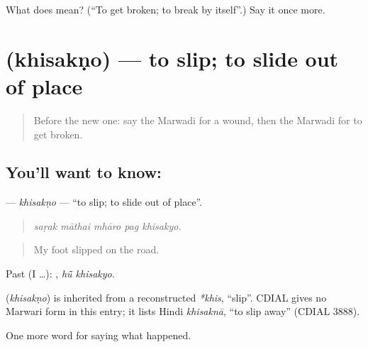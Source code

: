 \begin{tcolorbox}[breakable,colback=teal!4,colframe=teal!35!black,title={Before you move on}]
What does  mean? (\textquotedblleft{}To get broken; to break by itself\textquotedblright{}.) Say it once more.
\end{tcolorbox}
\section[\texorpdfstring{\mw{खिसकणो} (khisakṇo)}{खिसकणो (khisakṇo)}]{ (khisakṇo) — to slip; to slide out of place}

\label{lesson:MW-C241-khisakno}



\begin{quote}
Before the new one: say the Marwadi for a wound, then the Marwadi for to get broken.
\end{quote}

\subsection*{You'll want to know: }
\textbf{} — \emph{khisakṇo} — \textquotedblleft{}to slip; to slide out of place\textquotedblright{}.

\begin{quote}
    
\end{quote}

\begin{quote}
\emph{saṛak māthai mhāro pag khisakyo.}
\end{quote}

\begin{quote}
My foot slipped on the road.
\end{quote}

Past (I …):  , \emph{hū̃ khisakyo}.

\begin{cousinweb}
\textbf{} (\emph{khisakṇo}) is inherited from a reconstructed \emph{*khis}, \textquotedblleft{}slip\textquotedblright{}. CDIAL gives no Marwari form in this entry; it lists Hindi \emph{khisaknā}, \textquotedblleft{}to slip away\textquotedblright{} (CDIAL 3888).
\end{cousinweb}

\begin{grammarlens}[title={What you've built}]
One more word for saying what happened.
\end{grammarlens}

